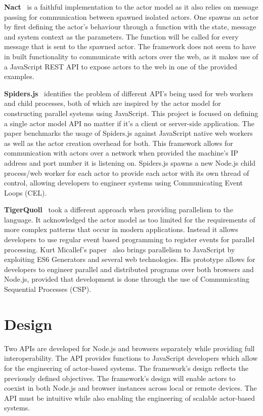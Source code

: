 \documentclass[lettersize,journal]{IEEEtran}
\begin{document}
\textbf{Nact}~\cite{nact} is a faithful implementation to the actor model as it also relies on message passing for communication between spawned isolated actors. One spawns an actor by first defining the actor's behaviour through a function with the state, message and system context as the parameters. The function will be called for every message that is sent to the spawned actor. The framework does not seem to have in built functionality to communicate with actors over the web, as it makes use of a JavaScript REST API to expose actors to the web in one of the provided examples.

\textbf{Spiders.js}~\cite{spidersjs} identifies the problem of different API's being used for web workers and child processes, both of which are inspired by the actor model for constructing parallel systems using JavaScript. This project is focused on defining a single actor model API no matter if it's a client or server-side application. The paper benchmarks the usage of Spiders.js against JavaScript native web workers as well as the actor creation overhead for both. This framework allows for communication with actors over a network when provided the machine's IP address and port number it is listening on. Spiders.js spawns a new Node.js child process/web worker for each actor to provide each actor with its own thread of control, allowing developers to engineer systems using Communicating Event Loops (CEL).

\textbf{TigerQuoll}~\cite{tigerquoll} took a different approach when providing parallelism to the language. It acknowledged the actor model as too limited for the requirements of more complex patterns that occur in modern applications. Instead it allows developers to use regular event based programming to register events for parallel processing. Kurt Micallef's paper~\cite{kurt} also brings parallelism to JavaScript by exploiting ES6 Generators and several web technologies. His prototype allows for developers to engineer parallel and distributed programs over both browsers and Node.js, provided that development is done through the use of Communicating Sequential Processes (CSP).
\section{Design}
Two APIs are developed for Node.js and browsers separately while providing full interoperability. The API provides functions to JavaScript developers which allow for the engineering of actor-based systems. The framework's design reflects the previously defined objectives. The framework's design will enable actors to coexist in both Node.js and browser instances across local or remote devices. The API must be intuitive while also enabling the engineering of scalable actor-based systems.
\end{document}
